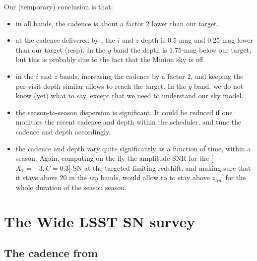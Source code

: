 \documentclass[\docopts]{\docclass}
\begin{document}
Our (temporary) conclusion is that:
\begin{itemize}
\item in all bands, the cadence is about a factor 2 lower than our target.
\item at the cadence delivered by , the $i$ and $z$ depth
  is 0.5-mag and 0.25-mag lower than our target (resp). In the
  $y$-band the depth is 1.75-mag below our target, but this is
  probably due to the fact that the Minion sky is off.
\item in the $i$ and $z$ bands, increasing the cadence by a factor 2,
  and keeping the per-visit depth similar allows to reach the
  target. In the $y$ band, we do not know (yet) what to say, except
  that we need to understand our sky model.
\item the season-to-season dispersion is significant. It could be
  reduced if one monitors the recent cadence and depth within the
  scheduler, and tune the cadence and depth accordingly.
\item the cadence and depth vary quite significantly as a function of
  time, within a season. Again, computing on the fly the amplitude SNR
  for the [$X_1=-3, C=0.3$] SN at the targeted limiting redshift, and
  making sure that it stays above 20 in the $izy$ bands, would allow
  to to stay above $z_{lim}$ for the whole duration of the season
  season.
\end{itemize}

\section{The Wide LSST SN survey}
\label{sec:wide_cadence}

\subsection{The cadence from }
\label{sec:results}
\end{document}
